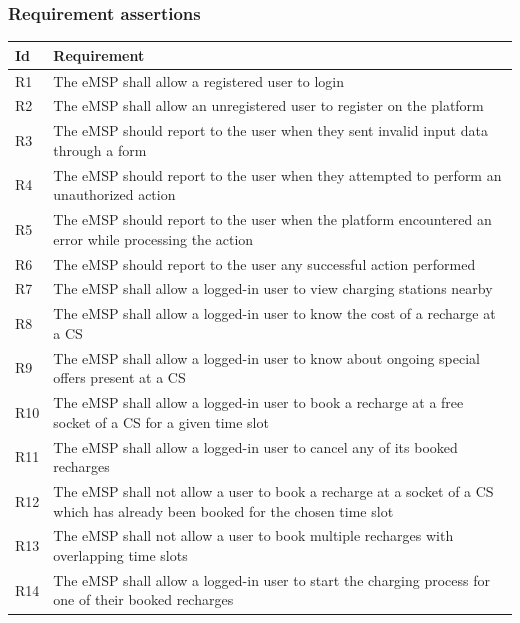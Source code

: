 \documentclass[11pt]{article}
\begin{document}
\subsubsection{Requirement assertions}

\begin{table}[H]
    \centering
    \setlength{\tabcolsep}{18pt}
    \renewcommand{\arraystretch}{1.2}
    \begin{tabularx}{\textwidth}{|>{\centering\hsize=0.1\hsize}X|>{\hsize=1.9\hsize}X|}
        \hline
        \textbf{Id} & \textbf{Requirement} \\
        \hline
        R1 & The eMSP shall allow a registered user to login \\
        \hline
        R2 & The eMSP shall allow an unregistered user to register on the platform \\
        \hline
        R3 & The eMSP should report to the user when they sent invalid input data through a form \\
        \hline
        R4 & The eMSP should report to the user when they attempted to perform an unauthorized action \\
        \hline
        R5 & The eMSP should report to the user when the platform encountered an error while processing the action \\
        \hline
        R6 & The eMSP should report to the user any successful action performed \\
        \hline
        R7 & The eMSP shall allow a logged-in user to view charging stations nearby \\
        \hline
        R8 & The eMSP shall allow a logged-in user to know the cost of a recharge at a CS \\
        \hline
        R9 & The eMSP shall allow a logged-in user to know about ongoing special offers present at a CS \\
        \hline
        R10 & The eMSP shall allow a logged-in user to book a recharge at a free socket of a CS for a given time slot \\
        \hline
        R11 & The eMSP shall allow a logged-in user to cancel any of its booked recharges \\
        \hline
        R12 & The eMSP shall not allow a user to book a recharge at a socket of a CS which has already been booked for the chosen time slot \\
        \hline
        R13 & The eMSP shall not allow a user to book multiple recharges with overlapping time slots \\
        \hline
        R14 & The eMSP shall allow a logged-in user to start the charging process for one of their booked recharges \\
        \hline
    \end{tabularx}
    \label{tab:requirements}
\end{table}
\end{document}
